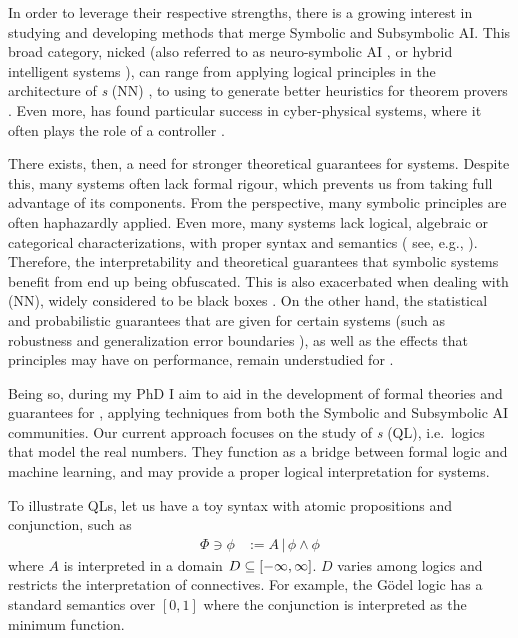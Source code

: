 In order to leverage their respective strengths, there is a growing interest in studying and developing methods that merge Symbolic and Subsymbolic AI. This broad category, nicked \emph{\InAI{}}  \citep{Platzer_2024} (also referred to as neuro-symbolic AI \citep{d2009neural}, or hybrid intelligent systems \citep{medsker2012hybrid}), can range from applying logical principles in the architecture of \emph{ \NN{}s} (NN)  \citep{badreddine2022logic}, to using \SuAI{} to generate better heuristics for theorem provers \citep{laurent2022learning}. Even more, \InAI{} has found particular success in cyber-physical systems, where it often plays the role of a controller \citep{Platzer_2024}. 

 There exists, then, a need for stronger theoretical guarantees for \InAI{} systems. Despite this, many \InAI{} systems often lack formal rigour, which prevents us from taking full advantage of its components. From the \SiAI{} perspective,  many symbolic principles are often haphazardly applied. Even more, many \InAI{} systems lack logical, algebraic or categorical characterizations, with proper syntax and semantics ( see, e.g., \cite{kaposi2024second}). Therefore, the interpretability and theoretical guarantees that symbolic systems benefit from end up being obfuscated. This is also exacerbated when dealing with \emph{\NN{}} (NN), widely considered to be black boxes \citep{buhrmester2021analysis}. On the other hand, the statistical and probabilistic guarantees that are given for certain \SuAI{}  systems (such as robustness \citep{casadio2022neural} and generalization error boundaries \citep{jakubovitz2019generalization} ), as well as the effects that \SiAI{} principles may have on performance, remain understudied for \InAI{}.

Being so, during my PhD I aim to aid in the development of formal theories and guarantees for \InAI{}, applying techniques from both the Symbolic and Subsymbolic AI communities. Our current approach focuses on the study of \emph{\QL{}s} (QL), i.e.~logics that model the real numbers. They function as a bridge between formal logic and machine learning, and may provide a proper logical interpretation for \InAI{} systems.

To illustrate QLs, let us have a toy syntax with atomic propositions and conjunction, such as
\begin{equation}
\begin{split}
    \Phi \ni \phi &:= A \,|\, \phi \land \phi
\end{split}
\end{equation}
where $A$ is interpreted in a domain $D \subseteq [-\infty,\infty]$. $D$ varies among logics and restricts the interpretation of connectives. For example, the
G\"{o}del logic \citep{BAAZ200723} has a standard semantics over $[0, 1]$ where the conjunction is interpreted as the minimum function.

